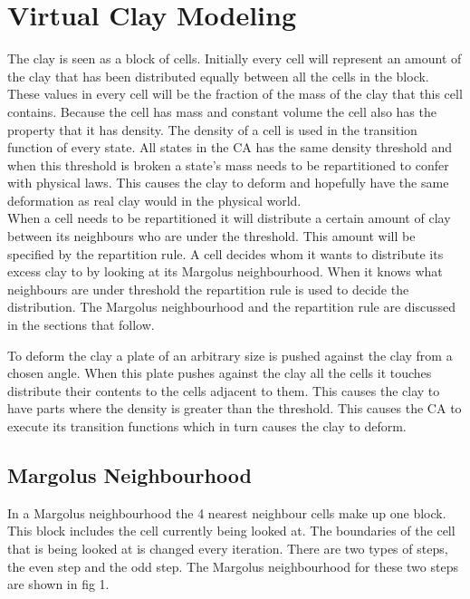 \documentclass[a4paper,11pt,titlepage]{article}
\begin{document}
\section {Virtual Clay Modeling}
The clay is seen as a block of cells. Initially every cell will represent an amount of the clay that has been distributed equally between all the cells in the block. These values in every cell will be the fraction of the mass of the clay that this cell contains. Because the cell has mass and constant volume the cell also has the property that it has density. The density of a cell is used in the transition function of every state. All states in the CA has the same density threshold and when this threshold is broken a state's mass needs to be repartitioned to confer with physical laws. This causes the clay to deform and hopefully have the same deformation as real clay would in the physical world.\\
When a cell needs to be repartitioned it will distribute a certain amount of clay between its neighbours who are under the threshold. This amount will be specified by the repartition rule. A cell decides whom it wants to distribute its excess clay to by looking at its Margolus neighbourhood. When it knows what neighbours are under threshold the repartition rule is used to decide the distribution. The Margolus neighbourhood and the repartition rule are discussed in the sections that follow.

To deform the clay a plate of an arbitrary size is pushed against the clay from a chosen angle. When this plate pushes against the clay all the cells it touches distribute their contents to the cells adjacent to them.
This causes the clay to have parts where the density is greater than the threshold. This causes the CA to execute its transition functions which in turn causes the clay to deform.
\subsection {Margolus Neighbourhood}
In a Margolus neighbourhood the 4 nearest neighbour cells make up one block. This block includes the cell currently being looked at. The boundaries of the cell that is being looked at is changed every iteration. There are two types of steps, the even step and the odd step. The Margolus neighbourhood for these two steps are shown in fig 1.
\end{document}
